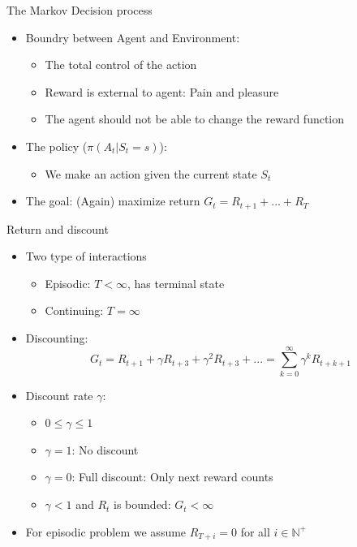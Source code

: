 \documentclass[10pt]{beamer}
\begin{document}
\begin{frame}{The Markov Decision process}

\begin{itemize}
\item Boundry between Agent and Environment:
\begin{itemize}
\item The {\color{uured}total control} of the action\pause
\item Reward is {\color{uured}external} to agent: Pain and pleasure
\item The agent should {\color{uured}not be able to change the reward function}
\end{itemize}
\pause
\item The policy ($\pi(A_t|S_t=s)$):
\begin{itemize}
\item We make an action given the current state $S_t$
\end{itemize}
\item {\color{uured}The goal}: (Again) maximize return $G_t = R_{t+1} + ... + R_{T}$
\end{itemize}

\end{frame}



\begin{frame}{Return and discount}

\begin{itemize}
\item Two type of interactions
\begin{itemize}
\item {\color{uured}Episodic}: $T <\infty$, has terminal state
\item {\color{uured}Continuing}: $T =\infty$
\end{itemize}
\item Discounting:
\[
G_t = R_{t+1} + \gamma R_{t+3} + \gamma^2 R_{t+3} + ... = \sum^\infty_{k=0} \gamma^k R_{t+k+1}
\]
\pause
\item Discount rate $\gamma$:
\begin{itemize}
\item $0 \leq \gamma \leq 1$\pause
\item $\gamma = 1$: {\color{uured}No discount}
\item $\gamma = 0$: {\color{uured}Full discount}: Only next reward counts
\item $\gamma < 1$ and $R_t$ is bounded: $G_t<\infty$
\end{itemize}
\pause
\item For episodic problem we assume $R_{T+i} = 0$ for all $i \in \mathbb{N}^+$
\end{itemize}

\end{frame}
\end{document}
